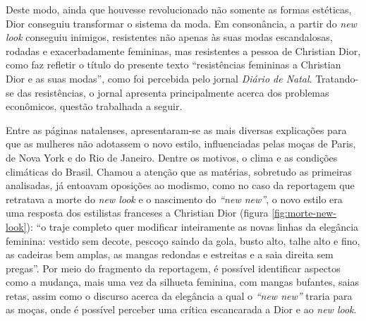 \begin{refsection}
    \nocite{ModistasFrancezes1948}

    Deste modo, ainda que houvesse revolucionado não somente as formas estéticas, Dior conseguiu transformar o sistema da moda. Em consonância, a partir do \textit{new look} conseguiu inimigos, resistentes não apenas às suas modas escandalosas, rodadas e exacerbadamente femininas, mas resistentes a pessoa de Christian Dior, como faz refletir o título do presente texto ``resistências femininas a Christian Dior e as suas modas'', como foi percebida pelo jornal \textit{Diário de Natal}. Tratando-se das resistências, o jornal apresenta principalmente acerca dos problemas econômicos, questão trabalhada a seguir.  

    Entre as páginas natalenses, apre\-sen\-ta\-ram-se as mais diversas explicações para que as mulheres não adotassem o novo estilo, influenciadas pelas moças de Paris, de Nova York e do Rio de Janeiro. Dentre os motivos, o clima e as condições climáticas do Brasil. Chamou a atenção que as matérias, sobretudo as primeiras analisadas, já entoavam oposições ao modismo, como no caso da reportagem que retratava a morte do \textit{new look} e o nascimento do \textit{``new new''}, o novo estilo era uma resposta dos estilistas franceses a Christian Dior (figura \ref{fig:morte-new-look}): ``o traje completo quer modificar inteiramente as novas linhas da elegância feminina: vestido sem decote, pescoço saindo da gola, busto alto, talhe alto e fino, as cadeiras bem amplas, as mangas redondas e estreitas e a saia direita sem pregas''. Por meio do fragmento da reportagem, é possível identificar aspectos como a mudança, mais uma vez da silhueta feminina, com mangas bufantes, saias retas, assim como o discurso acerca da elegância a qual o \textit{``new new''} traria para as moças, onde é possível perceber uma crítica escancarada a Dior e ao \textit{new look}.


\end{refsection}
